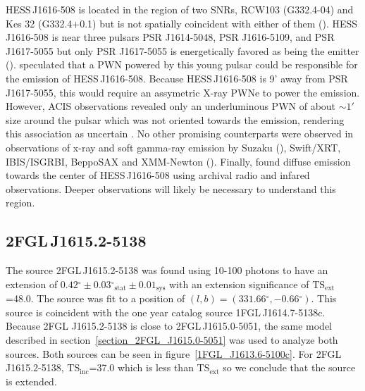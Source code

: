 \documentclass[12pt,preprint]{aastex}
\newcommand{\gev}{\text{GeV}\xspace}
\newcommand{\tev}{\text{TeV}\xspace}
\newcommand{\tsext}{{\ensuremath{\text{TS}_{\text{ext}}}}\xspace}
\newcommand{\tsinc}{\ensuremath{\text{TS}_{\text{inc}}}\xspace}
\newcommand{\chandra}{\text{{\em Chandra}}\xspace}
\newcommand{\sys}{\text{sys}\xspace}
\newcommand{\stat}{\text{stat}\xspace}
\renewcommand{\deg}{\ensuremath{^\circ}\xspace}
\renewcommand{\approx}{\sim\!\xspace}
\begin{document}
HESS\,J1616-508 is located in the region of two SNRs, RCW103
(G332.4-04) and Kes 32 (G332.4+0.1) but is not spatially coincident
with either of them (\cite{hess_plane_survey}).  HESS\,J1616-508 is near
three pulsars PSR J1614-5048, PSR J1616-5109, and PSR J1617-5055
but only PSR J1617-5055 is energetically favored as being the \tev
emitter (\cite{discovery_of_PSR_J1617-5055,integral_HESS_J1616-508}).
\cite{hess_plane_survey} speculated that a PWN powered by this young
pulsar could be responsible for the emission of HESS\,J1616-508.
Because HESS\,J1616-508 is 9' away from PSR J1617-5055, this would
require an assymetric X-ray PWNe to power the \tev emission. However,
\chandra ACIS observations revealed only an underluminous PWN of
about $\approx1'$ size around the pulsar which was not oriented
towards the \tev emission, rendering this association as uncertain
\cite{discovery_of_pwn_for_PSR_J1617-5055}.  No other promising
counterparts were observed in observations of x-ray and soft gamma-ray
emission by Suzaku (\cite{suzakzu_HESS_J1616-508}), Swift/XRT,
IBIS/ISGRBI, BeppoSAX and XMM-Newton (\cite{integral_HESS_J1616-508}).
Finally, \cite{discovery_of_pwn_for_PSR_J1617-5055} found diffuse
emission towards the center of HESS\,J1616-508 using archival radio and
infared observations.  Deeper observations will likely be necessary to
understand this region.

\subsection{2FGL\,J1615.2-5138}
\label{section_2FGL_J1615.2-5138}

The source 2FGL\,J1615.2-5138 was found using 10-100 \gev
photons to have an extension of $0.42\deg\pm0.03\deg_\stat\pm0.01_\sys$
with an extension significance of \tsext=48.0.  The source was fit to a
position of $(l,b)=(331.66\deg,-0.66\deg)$.  This source is coincident
with the one year catalog source 1FGL\,J1614.7-5138c.  Because 2FGL
J1615.2-5138 is close to 2FGL\,J1615.0-5051, the same model described
in section~\ref{section_2FGL_J1615.0-5051} was used to analyze both
sources. Both sources can be seen in figure~\ref{1FGL_J1613.6-5100c}.
For 2FGL\,J1615.2-5138, \tsinc=37.0 which is less than \tsext so we
conclude that the source is extended.
\end{document}
